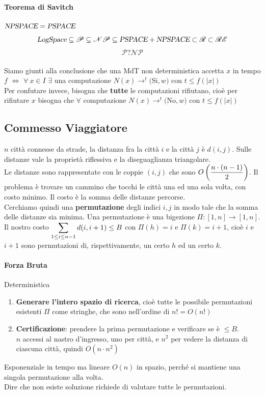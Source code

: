\documentclass[10pt]{book}
\begin{document}
\paragraph{Teorema di Savitch} $\textsl{NPSPACE} = \textsl{PSPACE}$
$$\textsl{LogSpace} \subseteq \mathscr{P} \subseteq \mathscr{NP} \subseteq \textsl{PSPACE} + \textsl{NPSPACE} \subset \mathscr{R} \subset \mathscr{RE}$$
$$\mathscr{P} ? \mathscr{NP}$$
\paragraph{} Siamo giunti alla conclusione che una MdT non deterministica accetta $x$ in tempo $f$ $\Leftrightarrow$ $\forall\:x\in I$ $\exists$ una computazione $N(x)\rightarrow^t($Si$, w)$ con $t \leq f(|x|)$\\
Per confutare invece, bisogna che \textbf{tutte} le computazioni rifiutano, cioè per rifiutare $x$ bisogna che $\forall$ computazione $N(x) \rightarrow^t ($No$, w)$ con $t \leq f(|x|)$
\subsection{Commesso Viaggiatore}
$n$ città connesse da strade, la distanza fra la città $i$ e la città $j$ è $d(i,j)$. Sulle distanze vale la proprietà riflessiva e la diseguaglianza triangolare.\\
Le distanze sono rappresentate con le coppie $(i, j)$ che sono $O\left(\mathlarger{\frac{n\cdot(n-1)}{2}}\right)$. Il problema è trovare un cammino che tocchi le città una ed una sola volta, con costo minimo. Il costo è la somma delle distanze percorse.\\
Cerchiamo quindi una \textbf{permutazione} degli indici $i, j$ in modo tale che la somma delle distanze sia minima. Una permutazione è una bigezione $\Pi : \left[1, n\right] \rightarrow \left[1, n\right]$.\\
Il nostro costo $\mathlarger{\sum_{1\leq i \leq n-1} d(i, i+1)} \leq B$ con $\Pi(h) = i$ e $\Pi(k) = i+1$, cioè $i$ e $i+1$ sono permutazioni di, rispettivamente, un certo $h$ ed un certo $k$.
\paragraph{Forza Bruta} Deterministica
\begin{enumerate}
	\item \textbf{Generare l'intero spazio di ricerca}, cioè tutte le possibile permutazioni esistenti $\Pi$ come stringhe, che sono nell'ordine di $n! = O(n!)$
	\item \textbf{Certificazione}: prendere la prima permutazione e verificare se è $\leq B$.\\
	$n$ accessi al nastro d'ingresso, uno per città, e $n^2$ per vedere la distanza di ciascuna città, quindi $O(n\cdot n^2)$
\end{enumerate}
Esponenziale in tempo ma lineare $O(n)$ in spazio, perché si mantiene una singola permutazione alla volta.\\
Dire che non esiste soluzione richiede di valutare tutte le permutazioni.
\end{document}
